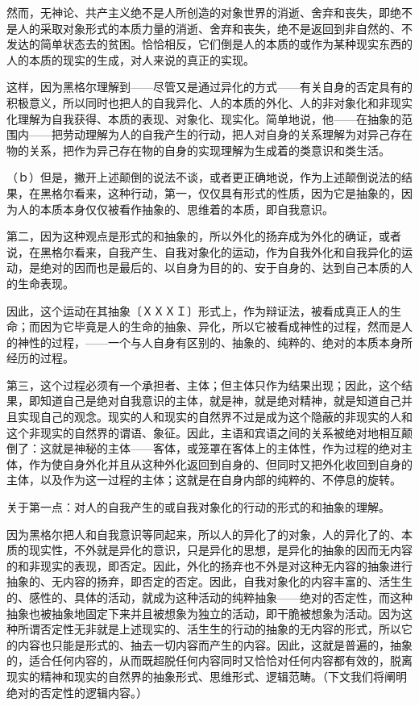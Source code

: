 \documentclass[a4paper,twoside,12pt,AutoFakeBold]{ctexart}
\begin{document}
然而，无神论、共产主义绝不是人所创造的对象世界的消逝、舍弃和丧失，即绝不是人的采取对象形式的本质力量的消逝、舍弃和丧失，绝不是返回到非自然的、不发达的简单状态去的贫困。恰恰相反，它们倒是人的本质的或作为某种现实东西的人的本质的现实的生成，对人来说的真正的实现。

这样，因为黑格尔理解到——尽管又是通过异化的方式——有关自身的否定具有的积极意义，所以同时也把人的自我异化、人的本质的外化、人的非对象化和非现实化理解为自我获得、本质的表现、对象化、现实化。简单地说，他——在抽象的范围内——把劳动理解为人的自我产生的行动，把人对自身的关系理解为对异己存在物的关系，把作为异己存在物的自身的实现理解为生成着的类意识和类生活。

（ｂ）但是，撇开上述颠倒的说法不谈，或者更正确地说，作为上述颠倒说法的结果，在黑格尔看来，这种行动，第一，仅仅具有形式的性质，因为它是抽象的，因为人的本质本身仅仅被看作抽象的、思维着的本质，即自我意识。

第二，因为这种观点是形式的和抽象的，所以外化的扬弃成为外化的确证，或者说，在黑格尔看来，自我产生、自我对象化的运动，作为自我外化和自我异化的运动，是绝对的因而也是最后的、以自身为目的的、安于自身的、达到自己本质的人的生命表现。

因此，这个运动在其抽象〔ＸＸＸＩ〕形式上，作为辩证法，被看成真正人的生命；而因为它毕竟是人的生命的抽象、异化，所以它被看成神性的过程，然而是人的神性的过程，——一个与人自身有区别的、抽象的、纯粹的、绝对的本质本身所经历的过程。

第三，这个过程必须有一个承担者、主体；但主体只作为结果出现；因此，这个结果，即知道自己是绝对自我意识的主体，就是神，就是绝对精神，就是知道自己并且实现自己的观念。现实的人和现实的自然界不过是成为这个隐蔽的非现实的人和这个非现实的自然界的谓语、象征。因此，主语和宾语之间的关系被绝对地相互颠倒了：这就是神秘的主体——客体，或笼罩在客体上的主体性，作为过程的绝对主体，作为使自身外化并且从这种外化返回到自身的、但同时又把外化收回到自身的主体，以及作为这一过程的主体；这就是在自身内部的纯粹的、不停息的旋转。

关于第一点：对人的自我产生的或自我对象化的行动的形式的和抽象的理解。

因为黑格尔把人和自我意识等同起来，所以人的异化了的对象，人的异化了的、本质的现实性，不外就是异化的意识，只是异化的思想，是异化的抽象的因而无内容的和非现实的表现，即否定。因此，外化的扬弃也不外是对这种无内容的抽象进行抽象的、无内容的扬弃，即否定的否定。因此，自我对象化的内容丰富的、活生生的、感性的、具体的活动，就成为这种活动的纯粹抽象——绝对的否定性，而这种抽象也被抽象地固定下来并且被想象为独立的活动，即干脆被想象为活动。因为这种所谓否定性无非就是上述现实的、活生生的行动的抽象的无内容的形式，所以它的内容也只能是形式的、抽去一切内容而产生的内容。因此，这就是普遍的，抽象的，适合任何内容的，从而既超脱任何内容同时又恰恰对任何内容都有效的，脱离现实的精神和现实的自然界的抽象形式、思维形式、逻辑范畴。（下文我们将阐明绝对的否定性的逻辑内容。）
\end{document}

